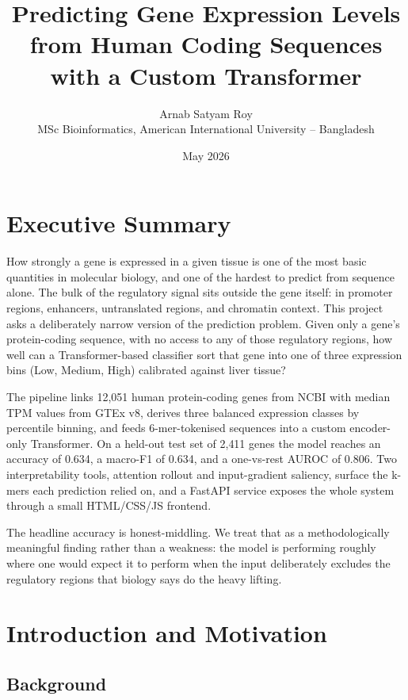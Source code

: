 \documentclass[11pt,a4paper]{article}
\title{\vspace{-2em}\textbf{Predicting Gene Expression Levels from Human Coding Sequences with a Custom Transformer}}
\author{Arnab Satyam Roy \\
MSc Bioinformatics, American International University -- Bangladesh}
\date{May 2026}
\begin{document}
\maketitle
\vspace{-1em}

\section*{Executive Summary}

How strongly a gene is expressed in a given tissue is one of the most basic quantities in molecular biology, and one of the hardest to predict from sequence alone. The bulk of the regulatory signal sits outside the gene itself: in promoter regions, enhancers, untranslated regions, and chromatin context. This project asks a deliberately narrow version of the prediction problem. Given only a gene's protein-coding sequence, with no access to any of those regulatory regions, how well can a Transformer-based classifier sort that gene into one of three expression bins (Low, Medium, High) calibrated against liver tissue?

The pipeline links 12{,}051 human protein-coding genes from NCBI with median TPM values from GTEx v8, derives three balanced expression classes by percentile binning, and feeds 6-mer-tokenised sequences into a custom encoder-only Transformer. On a held-out test set of 2{,}411 genes the model reaches an accuracy of 0.634, a macro-F1 of 0.634, and a one-vs-rest AUROC of 0.806. Two interpretability tools, attention rollout and input-gradient saliency, surface the k-mers each prediction relied on, and a FastAPI service exposes the whole system through a small HTML/CSS/JS frontend.

The headline accuracy is honest-middling. We treat that as a methodologically meaningful finding rather than a weakness: the model is performing roughly where one would expect it to perform when the input deliberately excludes the regulatory regions that biology says do the heavy lifting.

\section{Introduction and Motivation}

\subsection{Background}
\end{document}
